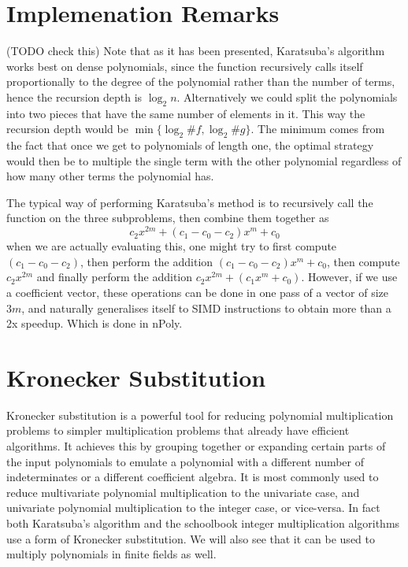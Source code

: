 \medskip

\section{Implemenation Remarks}
    (TODO check this)
    Note that as it has been presented, Karatsuba's algorithm works best on dense polynomials, since the function recursively calls itself proportionally to the degree of the polynomial rather than the number of terms, hence the recursion depth is $\log_2 n$. Alternatively we could split the polynomials into two pieces that have the same number of elements in it. This way the recursion depth would be $\min\{\log_2 \# f, \log_2 \# g\}$. The minimum comes from the fact that once we get to polynomials of length one, the optimal strategy would then be to multiple the single term with the other polynomial regardless of how many other terms the polynomial has.

    The typical way of performing Karatsuba's method is to recursively call the function on the three subproblems, then combine them together as
    \[
        c_2x^{2m} + (c_1 - c_0 - c_2) x^m + c_0
    \]
    when we are actually evaluating this, one might try to first compute $(c_1 - c_0 - c_2)$, then perform the addition $(c_1 - c_0 - c_2)x^m + c_0$, then compute $c_2x^{2m}$ and finally perform the addition $c_2x^{2m} + (c_1x^m + c_0)$. However, if we use a coefficient vector, these operations can be done in one pass of a vector of size $3m$, and naturally generalises itself to SIMD instructions to obtain more than a 2x speedup. Which is done in nPoly.

\medskip

\section{Kronecker Substitution}%
\label{sub:kronecker_substitution}

Kronecker substitution is a powerful tool for reducing polynomial multiplication problems to simpler multiplication problems that already have efficient algorithms. It achieves this by grouping together or expanding certain parts of the input polynomials to emulate a polynomial with a different number of indeterminates or a different coefficient algebra. It is most commonly used to reduce multivariate polynomial multiplication to the univariate case, and univariate polynomial multiplication to the integer case, or vice-versa. In fact both Karatsuba's algorithm and the schoolbook integer multiplication algorithms use a form of Kronecker substitution. We will also see that it can be used to multiply polynomials in finite fields as well. 

